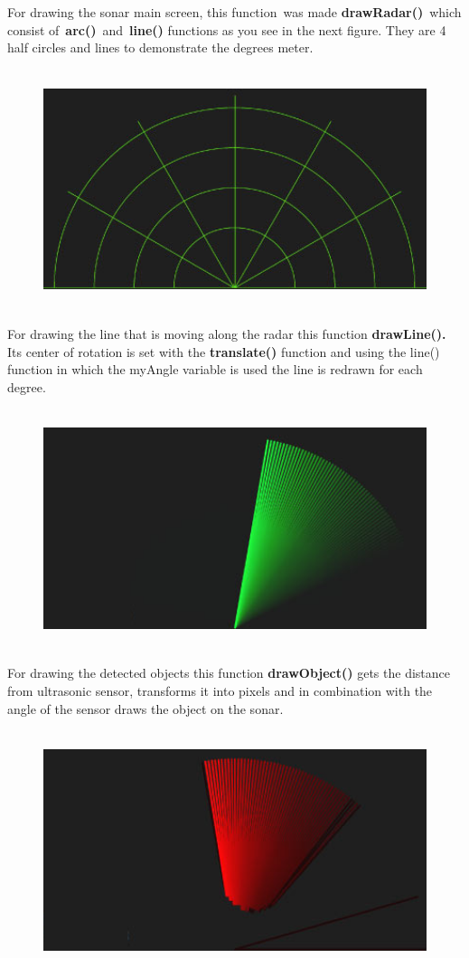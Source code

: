 For drawing the sonar main screen, this function~was made \textbf{drawRadar()}~which consist of~\textbf{arc()}~and~\textbf{line()} functions as you see in the next figure.
They are 4 half circles and lines to demonstrate the degrees meter.
\begin{figure}[H]
	\centering
	\includegraphics[width=14cm,height=7cm]{figures/sonar3}
\end{figure}
For drawing the line that is moving along the radar this function \textbf{drawLine(). }Its center of rotation is set with the \textbf{translate() }function and using the line() function in which the myAngle variable is used the line is redrawn for each degree.
\begin{figure}[H]
	\centering
	\includegraphics[width=14cm,height=7cm]{figures/sonar4}
\end{figure}
 For drawing the detected objects this function \textbf{drawObject()} gets the distance from ultrasonic sensor, transforms it into pixels and in combination with the angle of the sensor draws the object on the sonar.
\begin{figure}[H]
	\centering
	\includegraphics[width=14cm,height=7cm]{figures/sonar5}
\end{figure}


